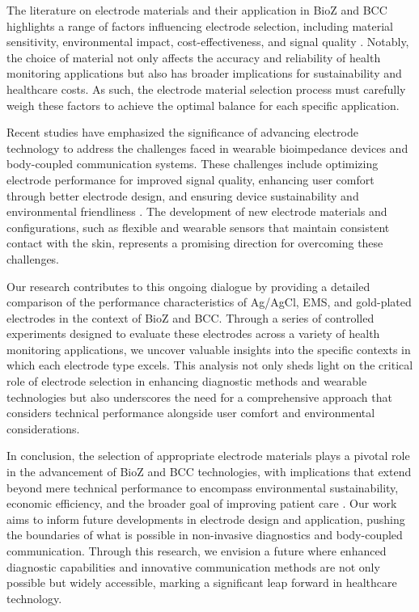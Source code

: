 {    The literature on electrode materials and their application in BioZ and BCC highlights a range of factors influencing electrode selection, including material sensitivity, environmental impact, cost-effectiveness, and signal quality \cite{Buxi2013correlation}. Notably, the choice of material not only affects the accuracy and reliability of health monitoring applications but also has broader implications for sustainability and healthcare costs. As such, the electrode material selection process must carefully weigh these factors to achieve the optimal balance for each specific application.
    
    Recent studies have emphasized the significance of advancing electrode technology to address the challenges faced in wearable bioimpedance devices and body-coupled communication systems. These challenges include optimizing electrode performance for improved signal quality, enhancing user comfort through better electrode design, and ensuring device sustainability and environmental friendliness \cite{zaira2023prediction}. The development of new electrode materials and configurations, such as flexible and wearable sensors that maintain consistent contact with the skin, represents a promising direction for overcoming these challenges.
    
    Our research contributes to this ongoing dialogue by providing a detailed comparison of the performance characteristics of Ag/AgCl, EMS, and gold-plated electrodes in the context of BioZ and BCC. Through a series of controlled experiments designed to evaluate these electrodes across a variety of health monitoring applications, we uncover valuable insights into the specific contexts in which each electrode type excels. This analysis not only sheds light on the critical role of electrode selection in enhancing diagnostic methods and wearable technologies but also underscores the need for a comprehensive approach that considers technical performance alongside user comfort and environmental considerations.
    
    In conclusion, the selection of appropriate electrode materials plays a pivotal role in the advancement of BioZ and BCC technologies, with implications that extend beyond mere technical performance to encompass environmental sustainability, economic efficiency, and the broader goal of improving patient care \cite{ormanis2020towards}. Our work aims to inform future developments in electrode design and application, pushing the boundaries of what is possible in non-invasive diagnostics and body-coupled communication. Through this research, we envision a future where enhanced diagnostic capabilities and innovative communication methods are not only possible but widely accessible, marking a significant leap forward in healthcare technology.
}